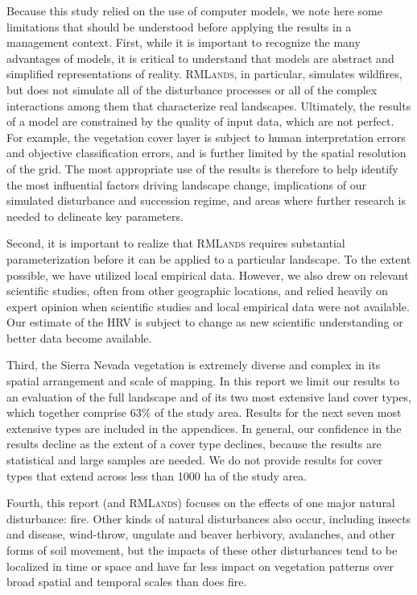 Because this study relied on the use of computer models, we note here some limitations that should be understood before applying the results in a management context. First, while it is important to recognize the many advantages of models, it is critical to understand that models are abstract and simplified representations of reality. \textsc{RMLands}, in particular, simulates wildfires, but does not simulate all of the disturbance processes or all of the complex interactions among them that characterize real landscapes. Ultimately, the results of a model are constrained by the quality of input data, which are not perfect. For example, the vegetation cover layer is subject to human interpretation errors and objective classification errors, and is further limited by the spatial resolution of the grid. The most appropriate use of the results is therefore to help identify the most influential factors driving landscape change, implications of our simulated disturbance and succession regime, and areas where further research is needed to delineate key parameters.

Second, it is important to realize that \textsc{RMLands} requires substantial parameterization before it can be applied to a particular landscape. To the extent possible, we have utilized local empirical data. However, we also drew on relevant scientific studies, often from other geographic locations, and relied heavily on expert opinion when scientific studies and local empirical data were not available. Our estimate of the HRV is subject to change as new scientific understanding or better data become available.

Third, the Sierra Nevada vegetation is extremely diverse and complex in its spatial arrangement and scale of mapping. In this report we limit our results to an evaluation of the full landscape and of its two most extensive land cover types, which together comprise 63\% of the study area. Results for the next seven most extensive types are included in the appendices. In general, our confidence in the results decline as the extent of a cover type declines, because the results are statistical and large samples are needed. We do not provide results for cover types that extend across less than 1000 ha of the study area.


Fourth, this report (and \textsc{RMLands}) focuses on the effects of one major natural disturbance: fire. Other kinds of natural disturbances also occur, including insects and disease, wind-throw, ungulate and beaver herbivory, avalanches, and other forms of soil movement, but the impacts of these other disturbances tend to be localized in time or space and have far less impact on vegetation patterns over broad spatial and temporal scales than does fire.
 


